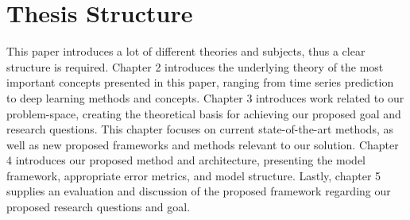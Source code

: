 
\section{Thesis Structure}
\label{sections:Introduction:Structure}

This paper introduces a lot of different theories and subjects,
thus a clear structure is required.
Chapter 2 introduces the underlying theory of the most important concepts presented in this paper,
ranging from time series prediction to deep learning methods and concepts.
Chapter 3 introduces work related to our problem-space, creating the theoretical basis for achieving our proposed goal and research questions.
This chapter focuses on current state-of-the-art methods,
as well as new proposed frameworks and methods relevant to our solution.
Chapter 4 introduces our proposed method and architecture,
presenting the model framework, appropriate error metrics, and model structure.
Lastly, chapter 5 supplies an evaluation and discussion of the proposed framework regarding our proposed research questions and goal.


